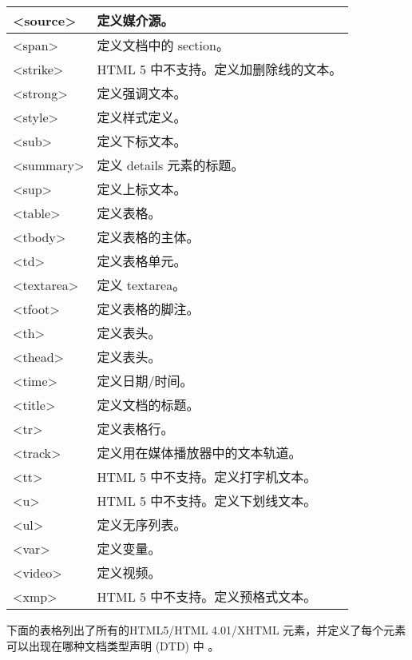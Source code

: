 \begin{longtable}{|p{80pt}|p{260pt}|}
\hline
<source>		&定义媒介源。\\
\hline
<span>		&定义文档中的 section。\\
\hline
<strike>		&HTML 5 中不支持。定义加删除线的文本。\\
\hline
<strong>		&定义强调文本。\\
\hline
<style>		&定义样式定义。\\
\hline
<sub>		&定义下标文本。\\
\hline
<summary>	&定义 details 元素的标题。\\
\hline
<sup>		&定义上标文本。\\
\hline
<table>		&定义表格。\\
\hline
<tbody>		&定义表格的主体。\\
\hline
<td>			&定义表格单元。\\
\hline
<textarea>	&定义 textarea。\\
\hline
<tfoot>		&定义表格的脚注。\\
\hline
<th>			&定义表头。\\
\hline
<thead>		&定义表头。\\
\hline
<time>		&定义日期/时间。\\
\hline
<title>		&定义文档的标题。\\
\hline
<tr>			&定义表格行。\\
\hline
<track>		&定义用在媒体播放器中的文本轨道。\\
\hline
<tt>			&HTML 5 中不支持。定义打字机文本。\\
\hline
<u>			&HTML 5 中不支持。定义下划线文本。\\
\hline
<ul>			&定义无序列表。\\
\hline
<var>		&定义变量。\\
\hline
<video>		&定义视频。\\
\hline
<xmp>		&HTML 5 中不支持。定义预格式文本。\\
\hline
\end{longtable}

下面的表格列出了所有的HTML5/HTML 4.01/XHTML 元素，并定义了每个元素可以出现在哪种文档类型声明 (DTD) 中 。


